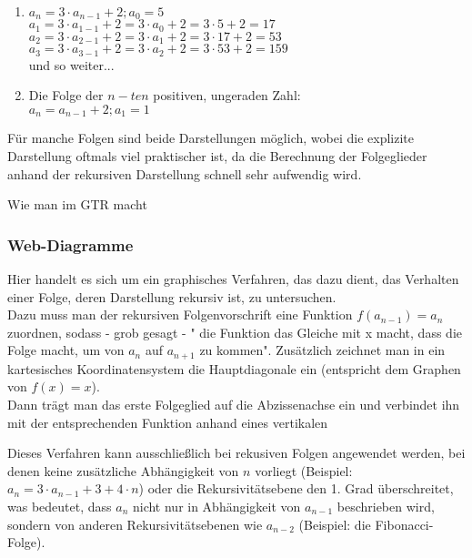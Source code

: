 \begin{Beispiel}
\begin{enumerate}
\item  $a_{n}=3\cdot a_{n-1}+2;a_{0}=5$\\
\indent$a_{1}=3\cdot a_{1-1}+2=3\cdot a_{0}+2=3\cdot5+2=17$\\
\indent$a_{2}=3\cdot a_{2-1}+2=3\cdot a_{1}+2=3\cdot17+2=53$\\
\indent$a_{3}=3\cdot a_{3-1}+2=3\cdot a_{2}+2=3\cdot53+2=159$\\
\indent und so weiter...
\item Die Folge der $n-ten$ positiven, ungeraden Zahl:\\
$a_{n}=a_{n-1}+2;a_{1}=1$
\end{enumerate}
\end{Beispiel}

\begin{Bemerkung}
Für manche Folgen sind beide Darstellungen möglich, wobei die explizite Darstellung oftmals viel praktischer ist, da die Berechnung der Folgeglieder anhand der rekursiven Darstellung schnell sehr aufwendig wird.
\end{Bemerkung}

\begin{GTR-Tipp}
Wie man im GTR macht
\end{GTR-Tipp}

\subsubsection{Web-Diagramme}
Hier handelt es sich um ein graphisches Verfahren, das dazu dient, das Verhalten einer Folge, deren Darstellung rekursiv ist, zu untersuchen.\\
Dazu muss man der rekursiven Folgenvorschrift eine Funktion $f(a_{n-1})=a_{n}$ zuordnen, sodass - grob gesagt - " die Funktion das Gleiche mit x macht, dass die Folge macht, um von $a_{n}$ auf $a_{n+1}$ zu kommen". Zusätzlich zeichnet man in ein kartesisches Koordinatensystem die Hauptdiagonale ein (entspricht dem Graphen von $f(x)=x$).\\
Dann trägt man das erste Folgeglied auf die Abzissenachse ein und verbindet ihn mit der entsprechenden Funktion anhand eines vertikalen\\

\begin{Beispiel}
\end{Beispiel}

\begin{Bemerkung}
Dieses Verfahren kann ausschließlich bei rekusiven Folgen angewendet werden, bei denen keine zusätzliche Abhängigkeit von $n$ vorliegt (Beispiel: $a_{n}=3\cdot a_{n-1}+3+4\cdot n$) oder die Rekursivitätsebene den 1. Grad überschreitet, was bedeutet, dass $a_{n}$ nicht nur in Abhängigkeit von $a_{n-1}$ beschrieben wird, sondern von anderen Rekursivitätsebenen wie $a_{n-2}$ (Beispiel: die Fibonacci-Folge).\\
\end{Bemerkung}

